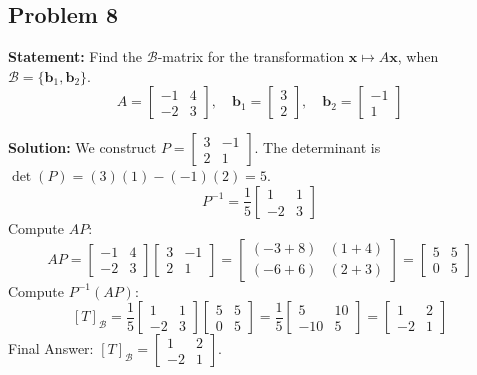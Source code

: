 \documentclass[11pt, a4paper]{article}
\theoremstyle{definition}
\theoremstyle{remark}
\begin{document}
\subsection{Problem 8}
\textbf{Statement:} Find the $\mathcal{B}$-matrix for the transformation $\mathbf{x} \mapsto A\mathbf{x}$, when $\mathcal{B} = \{\mathbf{b}_1, \mathbf{b}_2\}$.
\[
A = \begin{bmatrix} -1 & 4 \\ -2 & 3 \end{bmatrix}, \quad \mathbf{b}_1 = \begin{bmatrix} 3 \\ 2 \end{bmatrix}, \quad \mathbf{b}_2 = \begin{bmatrix} -1 \\ 1 \end{bmatrix}
\]

\textbf{Solution:}
We construct $P = \begin{bmatrix} 3 & -1 \\ 2 & 1 \end{bmatrix}$.
The determinant is $\det(P) = (3)(1) - (-1)(2) = 5$.
\[
P^{-1} = \frac{1}{5} \begin{bmatrix} 1 & 1 \\ -2 & 3 \end{bmatrix}
\]
Compute $AP$:
\[
AP = \begin{bmatrix} -1 & 4 \\ -2 & 3 \end{bmatrix} \begin{bmatrix} 3 & -1 \\ 2 & 1 \end{bmatrix} = \begin{bmatrix} (-3 + 8) & (1 + 4) \\ (-6 + 6) & (2 + 3) \end{bmatrix} = \begin{bmatrix} 5 & 5 \\ 0 & 5 \end{bmatrix}
\]
Compute $P^{-1}(AP)$:
\[
[T]_\mathcal{B} = \frac{1}{5} \begin{bmatrix} 1 & 1 \\ -2 & 3 \end{bmatrix} \begin{bmatrix} 5 & 5 \\ 0 & 5 \end{bmatrix} = \frac{1}{5} \begin{bmatrix} 5 & 10 \\ -10 & 5 \end{bmatrix} = \begin{bmatrix} 1 & 2 \\ -2 & 1 \end{bmatrix}
\]
Final Answer: $[T]_\mathcal{B} = \begin{bmatrix} 1 & 2 \\ -2 & 1 \end{bmatrix}$.
\end{document}
